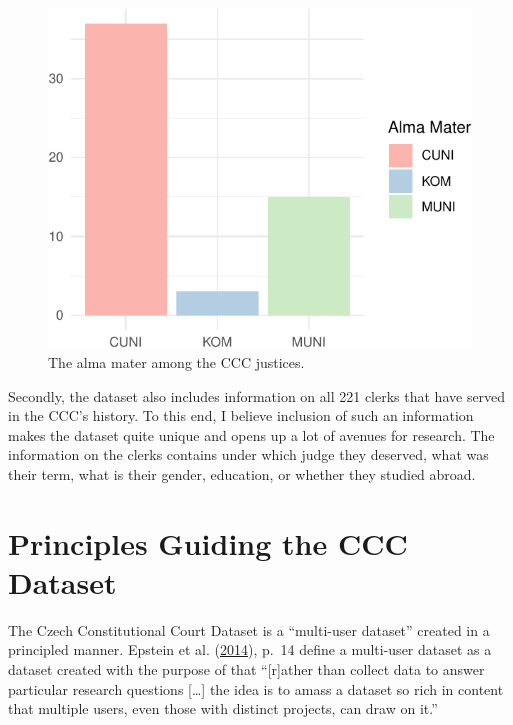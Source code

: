 \documentclass[
  11pt,
]{article}
\begin{document}
\begin{figure}
\centering
\includegraphics{ANONYMIZED_The_Czech_Constitutional_Court_Dataset_files/figure-latex/alma-1.pdf}
\caption{The alma mater among the CCC justices.}
\end{figure}

Secondly, the dataset also includes information on all 221 clerks that
have served in the CCC's history. To this end, I believe inclusion of
such an information makes the dataset quite unique and opens up a lot of
avenues for research. The information on the clerks contains under which
judge they deserved, what was their term, what is their gender,
education, or whether they studied abroad.

\hypertarget{principles-guiding-the-ccc-dataset}{%
\section{Principles Guiding the CCC
Dataset}\label{principles-guiding-the-ccc-dataset}}

The Czech Constitutional Court Dataset is a ``multi-user dataset''
created in a principled manner. Epstein et al.
(\protect\hyperlink{ref-epsteinIntroductionEmpiricalLegal2014}{2014}),
p.~14 define a multi-user dataset as a dataset created with the purpose
of that ``{[}r{]}ather than collect data to answer particular research
questions {[}\ldots{]} the idea is to amass a dataset so rich in content
that multiple users, even those with distinct projects, can draw on
it.''
\end{document}
